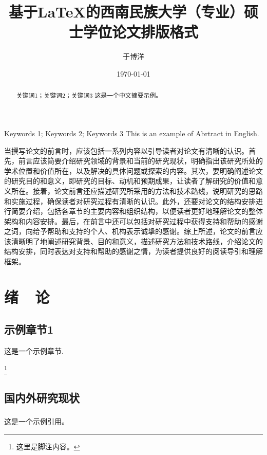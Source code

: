 \documentclass[a4paper,twoside]{ctexrep} %
\title{基于\LaTeX 的西南民族大学（专业）硕士学位论文排版格式}
\author{于博洋}
\date{\today} %
\begin{document}
\makecover

\begin{study}

\end{study}


\begin{abstract}{关键词1；关键词2；关键词3}  %
这是一个中文摘要示例。
\end{abstract}

\begin{abstractEng}{Keywords 1; Keywords 2; Keywords 3}
This is an example of Abrtract in English.
\end{abstractEng}


\begin{tocc}

\end{tocc}

\begin{foreword}
当撰写论文的前言时，应该包括一系列内容以引导读者对论文有清晰的认识。首先，前言应该简要介绍研究领域的背景和当前的研究现状，明确指出该研究所处的学术位置和价值所在，以及解决的具体问题或探索的内容。其次，要明确阐述论文的研究目的和意义，即研究的目标、动机和预期成果，让读者了解研究的价值和意义所在。接着，论文前言还应描述研究所采用的方法和技术路线，说明研究的思路和实施过程，确保读者对研究过程有清晰的认识。此外，还要对论文的结构安排进行简要介绍，包括各章节的主要内容和组织结构，以便读者更好地理解论文的整体架构和内容安排。最后，在前言中还可以包括对研究过程中获得支持和帮助的感谢之词，向给予帮助和支持的个人、机构表示诚挚的感谢。综上所述，论文的前言应该清晰明了地阐述研究背景、目的和意义，描述研究方法和技术路线，介绍论文的结构安排，同时表达对支持和帮助的感谢之情，为读者提供良好的阅读导引和理解框架。
\end{foreword}

\cfoot{\thepage} %
\setcounter{page}{1}
\pagestyle{fancy}

\chapter{绪~~论}
\section{示例章节1}
这是一个示例章节.

\lipsum[1-3] %
\footnote{这里是脚注内容。}
\section{国内外研究现状}
这是一个示例引用。\textsuperscript{\cite{dongshihai2004}}
\end{document}
